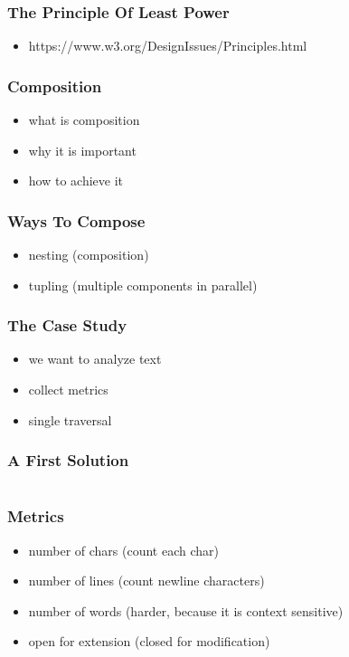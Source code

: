 \documentclass[aspectratio=169]{beamer}
\begin{document}
\begin{frame}
  \frametitle{The Principle Of Least Power}
  \begin{itemize}
  \item https://www.w3.org/DesignIssues/Principles.html
  \end{itemize}
\end{frame}

\begin{frame}
  \frametitle{Composition}
  \begin{itemize}
  \item what is composition
  \item why it is important
  \item how to achieve it
  \end{itemize}
\end{frame}

\begin{frame}
  \frametitle{Ways To Compose}
  \begin{itemize}
  \item nesting (composition)
  \item tupling (multiple components in parallel)
  \end{itemize}
\end{frame}

\begin{frame}
  \frametitle{The Case Study}
  \begin{itemize}
  \item we want to analyze text
  \item collect metrics
  \item single traversal
  \end{itemize}
\end{frame}

\begin{frame}[fragile]
  \frametitle{A First Solution}
  \inputminted[fontsize=\small]{scala}{snippets/imperative-wc.scala}
\end{frame}

\begin{frame}
  \frametitle{Metrics}
  \begin{itemize}
  \item number of chars (count each char)
  \item number of lines (count newline characters)
  \item number of words (harder, because it is context sensitive)
  \item open for extension (closed for modification)
  \end{itemize}
\end{frame}
\end{document}
